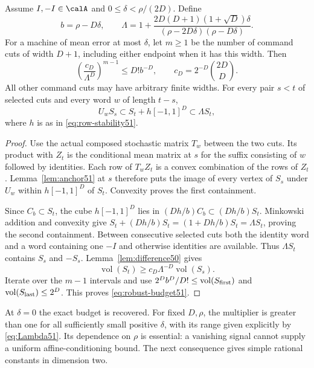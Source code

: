 \begin{theorem}
\label{thm:robust51}
Assume $I,-I\in\calA$ and $0\le\delta<\rho/(2D)$. Define
\begin{equation}\label{eq:Lambda51}
 b=\rho-D\delta,\qquad
 \Lambda=1+\frac{2D(D+1)(1+\sqrt D)\delta}
                    {(\rho-2D\delta)(\rho-D\delta)}.
\end{equation}
For a machine of mean error at most $\delta$, let $m\ge1$ be the
number of command cuts of width $D+1$, including either endpoint
when it has this width. Then
\begin{equation}\label{eq:robust-budget51}
 \left(\frac{c_D}{\Lambda^D}\right)^{m-1}
       \le D!b^{-D},\qquad c_D=2^{-D}{2D\choose D}.
\end{equation}
All other command cuts may have arbitrary finite widths. For every
pair $s<t$ of selected cuts and every word $w$ of length $t-s$,
\begin{equation}\label{eq:approx-containment51}
 U_wS_s\subset S_t+h[-1,1]^D\subset\Lambda S_t,
\end{equation}
where $h$ is as in \eqref{eq:row-stability51}.
\end{theorem}
\begin{proof}
Use the actual composed stochastic matrix $T_w$ between the two cuts.
Its product with $Z_t$ is the conditional mean matrix at $s$ for the
suffix consisting of $w$ followed by identities. Each row of $T_wZ_t$
is a convex combination of the rows of $Z_t$.
Lemma~\ref{lem:anchor51} at $s$ therefore puts the image of every
vertex of $S_s$ under $U_w$ within $h[-1,1]^D$ of $S_t$.
Convexity proves the first containment.

Since $C_b\subset S_t$, the cube $h[-1,1]^D$ lies in
$(Dh/b)C_b\subset(Dh/b)S_t$. Minkowski addition and convexity give
$S_t+(Dh/b)S_t=(1+Dh/b)S_t=\Lambda S_t$, proving the second
containment. Between consecutive selected cuts both the identity word
and a word containing one $-I$ and otherwise identities are available.
Thus $\Lambda S_t$ contains $S_s$ and $-S_s$.
Lemma~\ref{lem:difference50} gives
\[
 \operatorname{vol}(S_t)\ge c_D\Lambda^{-D}
                                  \operatorname{vol}(S_s).
\]
Iterate over the $m-1$ intervals and use
$2^Db^D/D!\le\operatorname{vol}(S_{\rm first})$ and
$\operatorname{vol}(S_{\rm last})\le2^D$.
This proves \eqref{eq:robust-budget51}.
\end{proof}

At $\delta=0$ the exact budget is recovered. For fixed $D,\rho$,
the multiplier is greater than one for all sufficiently small
positive $\delta$, with its range given explicitly by
\eqref{eq:Lambda51}. Its dependence on $\rho$ is essential: a
vanishing signal cannot supply a uniform affine-conditioning bound.
The next consequence gives simple rational constants in dimension two.


